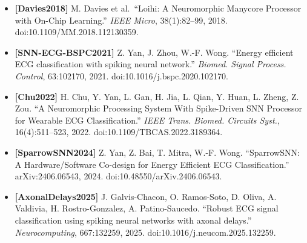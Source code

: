 \documentclass[
]{article}
\begin{document}
\begin{itemize}
  \emph{Proc. IEEE}, 111(9):1016--1054, 2023.
  doi:10.1109/JPROC.2023.3308088.
\item
  \textbf{{[}Davies2018{]}} M. Davies et al.~``Loihi: A Neuromorphic
  Manycore Processor with On-Chip Learning.'' \emph{IEEE Micro},
  38(1):82--99, 2018. doi:10.1109/MM.2018.112130359.
\item
  \textbf{{[}SNN-ECG-BSPC2021{]}} Z. Yan, J. Zhou, W.-F. Wong. ``Energy
  efficient ECG classification with spiking neural network.''
  \emph{Biomed. Signal Process. Control}, 63:102170, 2021.
  doi:10.1016/j.bspc.2020.102170.
\item
  \textbf{{[}Chu2022{]}} H. Chu, Y. Yan, L. Gan, H. Jia, L. Qian, Y.
  Huan, L. Zheng, Z. Zou. ``A Neuromorphic Processing System With
  Spike-Driven SNN Processor for Wearable ECG Classification.''
  \emph{IEEE Trans. Biomed. Circuits Syst.}, 16(4):511--523, 2022.
  doi:10.1109/TBCAS.2022.3189364.
\item
  \textbf{{[}SparrowSNN2024{]}} Z. Yan, Z. Bai, T. Mitra, W.-F. Wong.
  ``SparrowSNN: A Hardware/Software Co-design for Energy Efficient ECG
  Classification.'' arXiv:2406.06543, 2024.
  doi:10.48550/arXiv.2406.06543.
\item
  \textbf{{[}AxonalDelays2025{]}} J. Galvis-Chacon, O. Ramos-Soto, D.
  Oliva, A. Valdivia, H. Rostro-Gonzalez, A. Patino-Saucedo. ``Robust
  ECG signal classification using spiking neural networks with axonal
  delays.'' \emph{Neurocomputing}, 667:132259, 2025.
  doi:10.1016/j.neucom.2025.132259.
\end{itemize}
\end{document}
